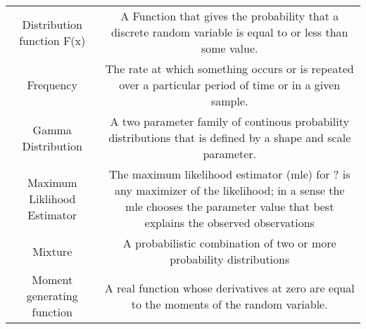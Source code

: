 \documentclass[]{book}
\theoremstyle{definition}
\theoremstyle{definition}
\theoremstyle{definition}
\theoremstyle{remark}
\begin{document}
\begin{longtable}[]{@{}cc@{}}
\begin{minipage}[t]{0.43\columnwidth}
Distribution function F(x)\strut
\end{minipage} & \begin{minipage}[t]{0.43\columnwidth}\centering\strut
A Function that gives the probability that a discrete random variable is
equal to or less than some value.\strut
\end{minipage}\tabularnewline
\begin{minipage}[t]{0.43\columnwidth}\centering\strut
Frequency\strut
\end{minipage} & \begin{minipage}[t]{0.43\columnwidth}\centering\strut
The rate at which something occurs or is repeated over a particular
period of time or in a given sample.\strut
\end{minipage}\tabularnewline
\begin{minipage}[t]{0.43\columnwidth}\centering\strut
Gamma Distribution\strut
\end{minipage} & \begin{minipage}[t]{0.43\columnwidth}\centering\strut
A two parameter family of continous probability distributions that is
defined by a shape and scale parameter.\strut
\end{minipage}\tabularnewline
\begin{minipage}[t]{0.43\columnwidth}\centering\strut
Maximum Liklihood Estimator\strut
\end{minipage} & \begin{minipage}[t]{0.43\columnwidth}\centering\strut
The maximum likelihood estimator (mle) for ? is any maximizer of the
likelihood; in a sense the mle chooses the parameter value that best
explains the observed observations\strut
\end{minipage}\tabularnewline
\begin{minipage}[t]{0.43\columnwidth}\centering\strut
Mixture\strut
\end{minipage} & \begin{minipage}[t]{0.43\columnwidth}\centering\strut
A probabilistic combination of two or more probability
distributions\strut
\end{minipage}\tabularnewline
\begin{minipage}[t]{0.43\columnwidth}\centering\strut
Moment generating function\strut
\end{minipage} & \begin{minipage}[t]{0.43\columnwidth}\centering\strut
A real function whose derivatives at zero are equal to the moments of
the random variable.\strut
\end{minipage}\tabularnewline

\end{longtable}
\end{document}
